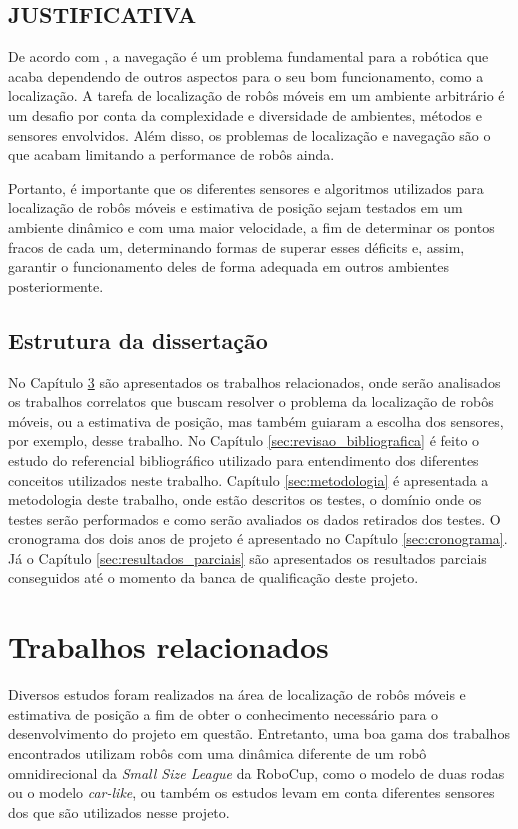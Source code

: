 \documentclass[acronym, symbols, table]{fei}
\begin{document}
	\section{JUSTIFICATIVA}
	
		De acordo com \textcite{alatise2020review}, a navegação é um problema fundamental para a robótica que acaba dependendo de outros aspectos para o seu bom funcionamento, como a localização. A tarefa de localização de robôs móveis em um ambiente arbitrário é um desafio por conta da complexidade e diversidade de ambientes, métodos e sensores envolvidos. Além disso, os problemas de localização e navegação são o que acabam limitando a performance de robôs ainda.
		
		Portanto, é importante que os diferentes sensores e algoritmos utilizados para localização de robôs móveis e estimativa de posição sejam testados em um ambiente dinâmico e com uma maior velocidade, a fim de determinar os pontos fracos de cada um, determinando formas de superar esses déficits e, assim, garantir o funcionamento deles de forma adequada em outros ambientes posteriormente.
	
	\section{Estrutura da dissertação}
	
		No Capítulo \ref{sec:trab_relacionados} são apresentados os trabalhos relacionados, onde serão analisados os trabalhos correlatos que buscam resolver o problema da localização de robôs móveis, ou a estimativa de posição, mas também guiaram a escolha dos sensores, por exemplo, desse trabalho. No Capítulo \ref{sec:revisao_bibliografica} é feito o estudo do referencial bibliográfico utilizado para entendimento dos diferentes conceitos utilizados neste trabalho. Capítulo \ref{sec:metodologia} é apresentada a metodologia deste trabalho, onde estão descritos os testes, o domínio onde os testes serão performados e como serão avaliados os dados retirados dos testes. O cronograma dos dois anos de projeto é apresentado no Capítulo \ref{sec:cronograma}. Já o Capítulo \ref{sec:resultados_parciais} são apresentados os resultados parciais conseguidos até o momento da banca de qualificação deste projeto.
		
\chapter{Trabalhos relacionados}\label{sec:trab_relacionados}
	Diversos estudos foram realizados na área de localização de robôs móveis e estimativa de posição a fim de obter o conhecimento necessário para o desenvolvimento do projeto em questão. Entretanto, uma boa gama dos trabalhos encontrados utilizam robôs com uma dinâmica diferente de um robô omnidirecional da \textit{Small Size League} da RoboCup, como o modelo de duas rodas ou o modelo \textit{car-like}, ou também os estudos levam em conta diferentes sensores dos que são utilizados nesse projeto.
	
\end{document}
